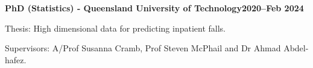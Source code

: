 \textbf{PhD (Statistics) - Queensland University of Technology\hfill 2020--Feb 2024} \par
Thesis: High dimensional data for predicting inpatient falls.\par
Supervisors: A/Prof Susanna Cramb, Prof Steven McPhail and Dr Ahmad Abdel-hafez.\par